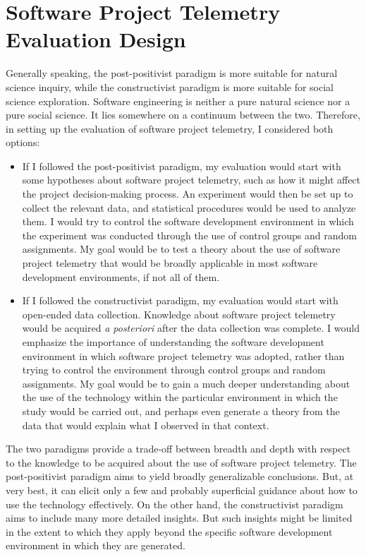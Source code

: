 \section{Software Project Telemetry Evaluation Design}
\label{EvaluationStrategy:EvaluationStategy}

Generally speaking, the post-positivist paradigm is more suitable for natural science inquiry, while the constructivist paradigm is more suitable for social science exploration. Software engineering is neither a pure natural science nor a pure social science. It lies somewhere on a continuum between the two. Therefore, in setting up the evaluation of software project telemetry, I considered both options:

\begin{itemize}
	\item If I followed the post-positivist paradigm, my evaluation would start with some hypotheses about software project telemetry, such as how it might affect the project decision-making process. An experiment would then be set up to collect the relevant data, and statistical procedures would be used to analyze them. 
I would try to control the software development environment in which the experiment was conducted through the use of control groups and random assignments. My goal would be to test a theory about the use of software project telemetry that would be broadly applicable in most software development environments, if not all of them.
	
	\item If I followed the constructivist paradigm, my evaluation would start with open-ended data collection. Knowledge about software project telemetry would be acquired \textit{a posteriori} after the data collection was complete. I would emphasize the importance of understanding the software development environment in which software project telemetry was adopted, rather than trying to control the environment through control groups and random assignments. My goal would be to gain a much deeper understanding about the use of the technology within the particular environment in which the study would be carried out, and perhaps even generate a theory from the data that would explain what I observed in that context.
\end{itemize}

The two paradigms provide a trade-off between breadth and depth with respect to the knowledge to be acquired about the use of software project telemetry. The post-positivist paradigm aims to yield broadly generalizable conclusions. But, at very best, it can elicit only a few and probably superficial guidance about how to use the technology effectively. On the other hand, the constructivist paradigm aims to include many more detailed insights. But such insights might be limited in the extent to which they apply beyond the specific software development environment in which they are generated.

